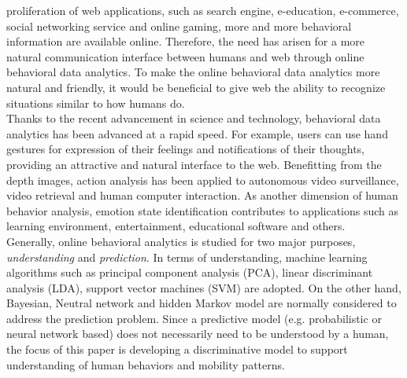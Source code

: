 \documentclass[10pt,journal,compsoc]{IEEEtran}
\begin{document}
 proliferation of web applications, such as search engine, e-education, e-commerce, social networking service and online gaming, more and more behavioral information are available online. Therefore, the need has arisen for a more natural communication interface between humans and web through online behavioral data analytics. To make the online behavioral data analytics more natural and friendly, it would be beneficial to give web the ability to recognize situations similar to how humans do.\\\indent
Thanks to the recent advancement in science and technology, behavioral data analytics has been advanced at a rapid speed. For example, users can use hand gestures for expression of their feelings and notifications of their thoughts, providing an attractive and natural interface to the web. Benefitting from the depth images, action analysis has been applied to autonomous video surveillance, video retrieval and human computer interaction. As another dimension of human behavior analysis, emotion state identification contributes to applications such as learning environment, entertainment, educational software and others.\\\indent Generally, online behavioral analytics is studied for two major purposes, \textit{understanding} and \textit{prediction}. In terms of understanding, machine learning algorithms such as principal component analysis (PCA), linear discriminant analysis (LDA), support vector machines (SVM) are adopted. On the other hand, Bayesian, Neutral network and hidden Markov model are normally considered to address the prediction problem. Since a predictive model (e.g. probabilistic or neural network based) does not necessarily need to be understood by a human, the focus of this paper is developing a discriminative model to support understanding of human behaviors and mobility patterns.\\\indent
\end{document}
